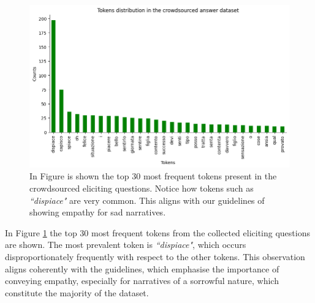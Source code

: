 \begin{figure}[!htbp]
    \centering
    \includegraphics[width=1\linewidth]{assets//imgs/dataset-top-30-answers.png}
    \caption{In Figure is shown the top 30 most frequent tokens present in the crowdsourced eliciting questions. Notice how tokens such as \emph{``dispiace"} are very common. This aligns with our guidelines of showing empathy for sad narratives. }
    \label{fig:dataset-top-30-answers}
\end{figure}

In Figure \ref{fig:dataset-top-30-answers} the top 30 most frequent tokens from the collected eliciting questions are shown. The most prevalent token is \emph{``dispiace"}, which occurs disproportionately frequently with respect to the other tokens. This observation aligns coherently with the guidelines, which emphasise the importance of conveying empathy, especially for narratives of a sorrowful nature, which constitute the majority of the dataset.

